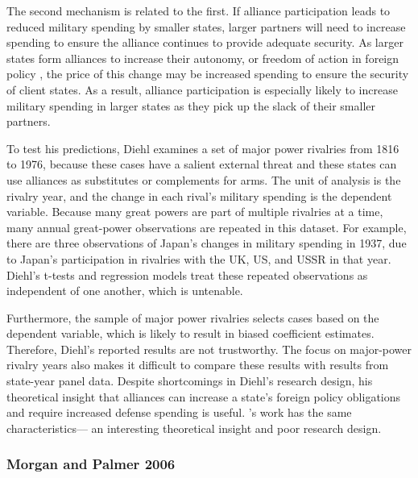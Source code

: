\documentclass[12pt]{article}
\begin{document}
The second mechanism is related to the first. 
If alliance participation leads to reduced military spending by smaller states, larger partners will need to increase spending to ensure the alliance continues to provide adequate security. 
As larger states form alliances to increase their autonomy, or freedom of action in foreign policy \citep{Morrow1991}, the price of this change may be increased spending to ensure the security of client states. 
As a result, alliance participation is especially likely to increase military spending in larger states as they pick up the slack of their smaller partners. 


To test his predictions, Diehl examines a set of major power rivalries from 1816 to 1976, because these cases have a salient external threat and these states can use alliances as substitutes or complements for arms.
The unit of analysis is the rivalry year, and the change in each rival's military spending is the dependent variable. 
Because many great powers are part of multiple rivalries at a time, many annual great-power observations are repeated in this dataset. 
For example, there are three observations of Japan's changes in military spending in 1937, due to Japan's participation in rivalries with the UK, US, and USSR in that year. %
Diehl's t-tests and regression models treat these repeated observations as independent of one another, which is untenable. 


Furthermore, the sample of major power rivalries selects cases based on the dependent variable, which is likely to result in biased coefficient estimates. 
Therefore, Diehl's reported results are not trustworthy. 
The focus on major-power rivalry years also makes it difficult to compare these results with results from state-year panel data. 
Despite shortcomings in Diehl's research design, his theoretical insight that alliances can increase a state's foreign policy obligations and require increased defense spending is useful.  
\citet{MorganPalmer2006}'s work has the same characteristics--- an interesting theoretical insight and poor research design. 



\subsubsection{Morgan and Palmer 2006}
\end{document}
